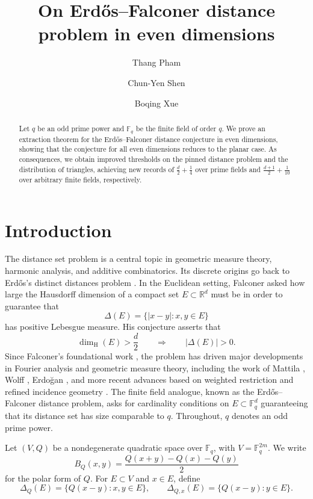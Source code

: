 \documentclass[11pt]{article}
\title{On Erd\H{o}s--Falconer distance problem in even dimensions}
\author{Thang Pham \and Chun-Yen Shen\and Boqing Xue}
\date{}
\newcommand{\F}{\mathbb F}
\begin{document}
\maketitle

\begin{abstract}
Let $q$ be an odd prime power and $\mathbb{F}_q$ be the finite field of order $q$. We prove an extraction theorem for the Erdős--Falconer distance conjecture in even dimensions, showing that the conjecture for all even dimensions reduces to the planar case. As consequences, we obtain improved thresholds on the pinned distance problem and the distribution of triangles, achieving new records of $\frac{d}{2}+\frac{1}{4}$ over prime fields and $\frac{d+1}{2}+\frac{1}{10}$ over arbitrary finite fields, respectively.
\end{abstract}








\section{Introduction}
The distance set problem is a central topic in geometric measure theory,
harmonic analysis, and additive combinatorics.  Its discrete origins go
back to Erd\H{o}s's distinct distances problem
\cite{Erdos,GuthKatz}.  In the Euclidean setting, Falconer asked how large
the Hausdorff dimension of a compact set \(E\subset\mathbb R^d\) must be in
order to guarantee that
\[
    \Delta(E)=\{|x-y|:x,y\in E\}
\]
has positive Lebesgue measure.  His conjecture asserts that
\[
    \dim_{\mathrm H}(E)>\frac d2
    \qquad\Longrightarrow\qquad
    |\Delta(E)|>0.
\]
Since Falconer's foundational work \cite{Falconer}, the problem has driven
major developments in Fourier analysis and geometric measure theory,
including the work of Mattila \cite{Mattila}, Wolff \cite{Wolff},
Erdo\u{g}an \cite{Erdogan}, and more recent advances based on weighted
restriction and refined incidence geometry
\cite{DGOWWZ,GIOW,PeresSchlag,KS}. The finite field analogue, known as the Erd\H{o}s--Falconer distance
problem, asks for cardinality conditions on \(E\subset\F_q^d\)
guaranteeing that its distance set has size comparable to \(q\). Throughout, \(q\) denotes an odd prime power.

Let
\((V,Q)\) be a nondegenerate quadratic space over \(\F_q\), with
\(V=\F_q^{2m}\).  We write
\[
    B_Q(x,y)
    =
    \frac{Q(x+y)-Q(x)-Q(y)}{2}
\]
for the polar form of \(Q\).  For \(E\subset V\) and \(x\in E\), define
\[
    \Delta_Q(E)
    =
    \{Q(x-y):x,y\in E\},
    \qquad
    \Delta_{Q,x}(E)
    =
    \{Q(x-y):y\in E\}.
\]
\end{document}
